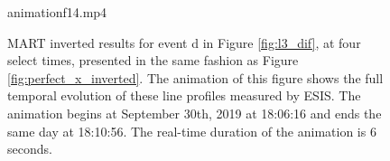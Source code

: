 \documentclass[linenumbers,trackchanges]{aastex63}
\begin{document}
        
        \begin{figure}
        	\begin{interactive}{animation}{f14.mp4}
        	\end{interactive}
    	\caption{MART inverted results for event d in Figure \ref{fig:l3_dif}, at four select times, presented in the same fashion as Figure \ref{fig:perfect_x_inverted}. 
The animation of this figure shows the full temporal evolution of these line profiles measured by ESIS. The animation begins at September 30th, 2019 at 18:06:16 and ends the same day at 18:10:56. The real-time duration of the animation is 6 seconds.
    	}
    	\label{fig:other_x_inverted}
    	\end{figure}
    	
\end{document}
